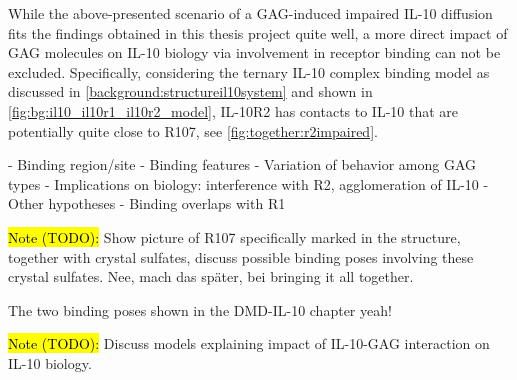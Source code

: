 While the above-presented scenario of a GAG-induced impaired IL-10 diffusion
fits the findings obtained in this thesis project quite well, a more direct
impact of GAG molecules on IL-10 biology via involvement in receptor binding
can not be excluded. Specifically, considering the ternary IL-10 complex
binding model as discussed in \cref{background:structureil10system} and shown in
\cref{fig:bg:il10_il10r1_il10r2_model}, IL-10R2 has contacts to IL-10 that
are potentially quite close to R107, see \cref{fig:together:r2impaired}.




    - Binding region/site
    - Binding features
    - Variation of behavior among GAG types
    - Implications on biology: interference with R2, agglomeration of IL-10
    - Other hypotheses
        - Binding overlaps with R1


\hl{Note (TODO):}
Show picture of R107 specifically marked in the structure, together with
crystal sulfates, discuss possible binding poses involving these crystal
sulfates. Nee, mach das später, bei bringing it all together.

The two binding poses shown in the DMD-IL-10 chapter yeah!


\hl{Note (TODO):}
Discuss models explaining impact of IL-10-GAG interaction on IL-10 biology.



